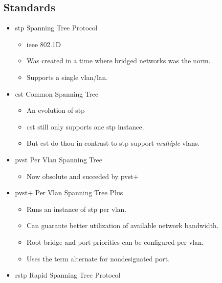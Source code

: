 
\subsection{Standards}

\begin{itemize}
    \item \gls{stp} {\scriptsize Spanning Tree Protocol}
    \begin{itemize}
        \item \gls{ieee} 802.1D
        \item Was created in a time where bridged networks was the norm.
        \item Supports a single vlan/lan.
    \end{itemize}
    \item \gls{cst} {\scriptsize Common Spanning Tree}
    \begin{itemize}
        \item An evolution of \gls{stp}
        \item \gls{cst} still only supports one \gls{stp} instance.
        \item But \gls{cst} do thou in contrast to \gls{stp} support \textit{multiple} vlans.
    \end{itemize}
    \item \gls{pvst} {\scriptsize Per Vlan Spanning Tree}
    \begin{itemize}
        \item Now obsolute and succeded by \gls{pvst+}
    \end{itemize}
    \item \gls{pvst+} {\scriptsize Per Vlan Spanning Tree Plus}
    \begin{itemize}
        \item Runs an instance of \gls{stp} per vlan.
        \item Can guarante better utilization of available network bandwidth.
        \item Root bridge and port priorities can be configured per vlan.
        \item Uses the term alternate for nondesignated port.
    \end{itemize}
    \item \gls{rstp} {\scriptsize Rapid Spanning Tree Protocol}

\end{itemize}
